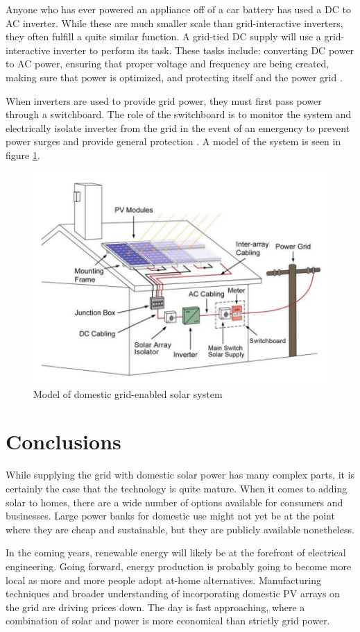 \documentclass[journal]{IEEEtran}
\begin{document}
	Anyone who has ever powered an appliance off of a car battery has used a DC to AC inverter. While these are much smaller scale than grid-interactive inverters, they often fulfill a quite similar function. A grid-tied DC supply will use a grid-interactive inverter to perform its task. These tasks include: converting DC power to AC power, ensuring that proper voltage and frequency are being created, making sure that power is optimized, and protecting itself and the power grid \citep{Stapleton2011}. 
	
	When inverters are used to provide grid power, they must first pass power through a switchboard. The role of the switchboard is to monitor the system and electrically isolate inverter from the grid in the event of an emergency to prevent power surges and provide general protection \citep{Stapleton2011}. A model of the system is seen in figure \ref{fig:domestic}.
	
	\begin{figure}[h]
		\centering
		\includegraphics[scale=0.45]{DomesticSolarModel.png}
		\caption{Model of domestic grid-enabled solar system \citep{Stapleton2011}}
		\label{fig:domestic}
	\end{figure}
	\section{Conclusions}
	While supplying the grid with domestic solar power has many complex parts, it is certainly the case that the technology is quite mature. When it comes to adding solar to homes, there are a wide number of options available for consumers and businesses. Large power banks for domestic use might not yet be at the point where they are cheap and sustainable, but they are publicly available nonetheless. 
	
	In the coming years, renewable energy will likely be at the forefront of electrical engineering. Going forward, energy production is probably going to become more local as more and more people adopt at-home alternatives. Manufacturing techniques and broader understanding of incorporating domestic PV arrays on the grid are driving prices down. The day is fast approaching, where a combination of solar and power is more economical than strictly grid power.
	
		
\end{document}
